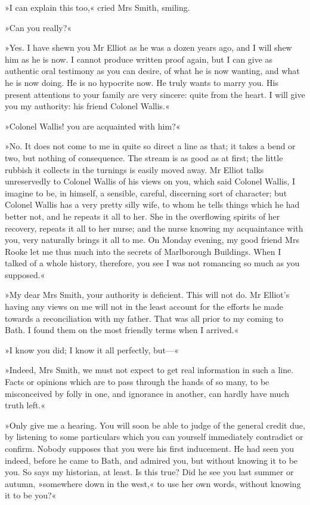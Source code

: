 »I can explain this too,« cried Mrs Smith, smiling.

»Can you really?«

»Yes. I have shewn you Mr Elliot as he was a dozen years ago, and I will shew him as he is now. I cannot produce written proof again, but I can give as authentic oral testimony as you can desire, of what he is now wanting, and what he is now doing. He is no hypocrite now. He truly wants to marry you. His present attentions to your family are very sincere: quite from the heart. I will give you my authority: his friend Colonel Wallis.«

»Colonel Wallis! you are acquainted with him?«

»No. It does not come to me in quite so direct a line as that; it takes a bend or two, but nothing of consequence. The stream is as good as at first; the little rubbish it collects in the turnings is easily moved away. Mr Elliot talks unreservedly to Colonel Wallis of his views on you, which said Colonel Wallis, I imagine to be, in himself, a sensible, careful, discerning sort of character; but Colonel Wallis has a very pretty silly wife, to whom he tells things which he had better not, and he repeats it all to her. She in the overflowing spirits of her recovery, repeats it all to her nurse; and the nurse knowing my acquaintance with you, very naturally brings it all to me. On Monday evening, my good friend Mrs Rooke let me thus much into the secrets of Marlborough Buildings. When I talked of a whole history, therefore, you see I was not romancing so much as you supposed.«

»My dear Mrs Smith, your authority is deficient. This will not do. Mr Elliot's having any views on me will not in the least account for the efforts he made towards a reconciliation with my father. That was all prior to my coming to Bath. I found them on the most friendly terms when I arrived.«

»I know you did; I know it all perfectly, but—«

»Indeed, Mrs Smith, we must not expect to get real information in such a line. Facts or opinions which are to pass through the hands of so many, to be misconceived by folly in one, and ignorance in another, can hardly have much truth left.«

»Only give me a hearing. You will soon be able to judge of the general credit due, by listening to some particulars which you can yourself immediately contradict or confirm. Nobody supposes that you were his first inducement. He had seen you indeed, before he came to Bath, and admired you, but without knowing it to be you. So says my historian, at least. Is this true? Did he see you last summer or autumn, »somewhere down in the west,« to use her own words, without knowing it to be you?«

